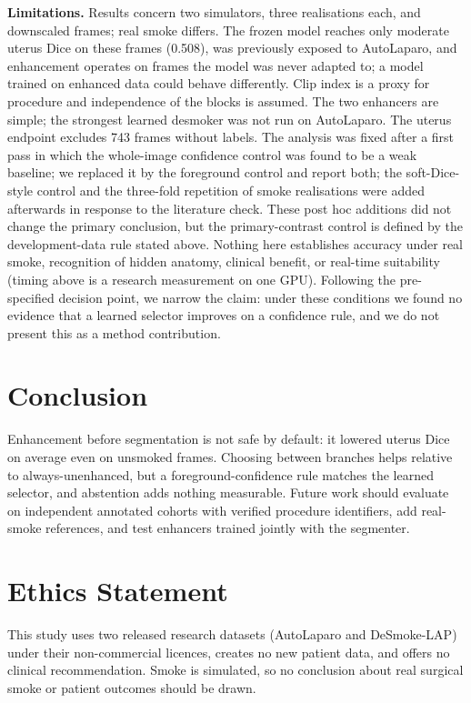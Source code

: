 \documentclass{midl}
\begin{document}
\textbf{Limitations.} Results concern two simulators, three realisations each, and downscaled frames; real smoke differs. The frozen model reaches only moderate uterus Dice on these frames (0.508), was previously exposed to AutoLaparo, and enhancement operates on frames the model was never adapted to; a model trained on enhanced data could behave differently. Clip index is a proxy for procedure and independence of the blocks is assumed. The two enhancers are simple; the strongest learned desmoker was not run on AutoLaparo. The uterus endpoint excludes 743 frames without labels. The analysis was fixed after a first pass in which the whole-image confidence control was found to be a weak baseline; we replaced it by the foreground control and report both; the soft-Dice-style control and the three-fold repetition of smoke realisations were added afterwards in response to the literature check. These post hoc additions did not change the primary conclusion, but the primary-contrast control is defined by the development-data rule stated above. Nothing here establishes accuracy under real smoke, recognition of hidden anatomy, clinical benefit, or real-time suitability (timing above is a research measurement on one GPU). Following the pre-specified decision point, we narrow the claim: under these conditions we found no evidence that a learned selector improves on a confidence rule, and we do not present this as a method contribution.

\section{Conclusion}
Enhancement before segmentation is not safe by default: it lowered uterus Dice on average even on unsmoked frames. Choosing between branches helps relative to always-unenhanced, but a foreground-confidence rule matches the learned selector, and abstention adds nothing measurable. Future work should evaluate on independent annotated cohorts with verified procedure identifiers, add real-smoke references, and test enhancers trained jointly with the segmenter.

\section*{Ethics Statement}
This study uses two released research datasets (AutoLaparo and DeSmoke-LAP) under their non-commercial licences, creates no new patient data, and offers no clinical recommendation. Smoke is simulated, so no conclusion about real surgical smoke or patient outcomes should be drawn.
\end{document}
